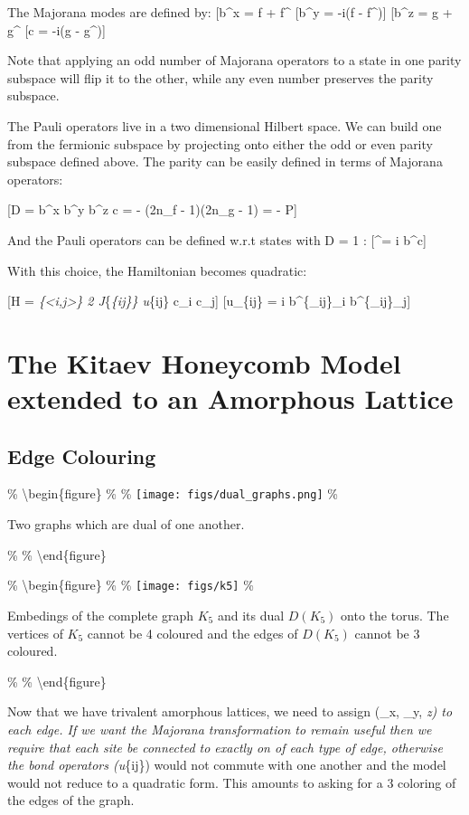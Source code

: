 The Majorana modes are defined by: {[}b\^{}x = f + f\^{}\dagger{]}
{[}b\^{}y = -i(f - f\^{}\dagger){]} {[}b\^{}z = g + g\^{}\dagger{]} {[}c
= -i(g - g\^{}\dagger){]}

Note that applying an odd number of Majorana operators to a state in one
parity subspace will flip it to the other, while any even number
preserves the parity subspace.

The Pauli operators live in a two dimensional Hilbert space. We can
build one from the fermionic subspace by projecting onto either the odd
or even parity subspace defined above. The parity can be easily defined
in terms of Majorana operators:

{[}D = b\^{}x b\^{}y b\^{}z c = - (2n\_f - 1)(2n\_g - 1) = - P{]}

And the Pauli operators can be defined w.r.t states with D = 1 :
{[}\sigma\^{}\alpha = i b\^{}\alpha c{]}

With this choice, the Hamiltonian becomes quadratic:

{[}H =  \sum\emph{\{\textless i,j\textgreater\} 2
J}\{\alpha\emph{\{ij\}\} u}\{ij\} c\_i c\_j{]} {[}u\_\{ij\} = i
b\^{}\{\alpha\_ij\}\_i b\^{}\{\alpha\_ij\}\_j{]}

\section{The Kitaev Honeycomb Model extended to an Amorphous Lattice}

\subsection{Edge Colouring}

\% \textbackslash begin\{figure\} \% \centering \%
\texttt{[image: figs/dual\_graphs.png]} \%

\caption{Two graphs which are dual of one another.}

\% \label{fig:dual_graphs} \% \textbackslash end\{figure\}

\% \textbackslash begin\{figure\} \% \centering \%
\texttt{[image: figs/k5]} \%

\caption{Embedings of the complete graph \(K_5\) and its dual \(D(K_5)\) onto the torus. The vertices of \(K_5\) cannot be 4 coloured and the edges of \(D(K_5)\) cannot be 3 coloured.}

\% \label{fig:k5} \% \textbackslash end\{figure\}

Now that we have trivalent amorphous lattices, we need to assign
(\sigma\_x, \sigma\_y, \sigma\emph{z) to each edge. If we want the
Majorana transformation to remain useful then we require that each site
be connected to exactly on of each type of edge, otherwise the bond
operators (u}\{ij\}) would not commute with one another and the model
would not reduce to a quadratic form. This amounts to asking for a 3
coloring of the edges of the graph.

